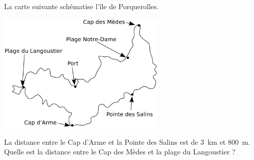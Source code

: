 
\begin{exercice}\label{exo2smath-0125}

La carte suivante schématise l’île de Porquerolles.

\includegraphics[width=8cm]{Porquerolles.pdf}

La distance entre le Cap d'Arme et la Pointe des Salins est de \SI{3}{\kilo\meter} et \SI{800}{\meter}. Quelle est la distance entre le Cap des Mèdes et la plage du Langoustier ?

\end{exercice}

